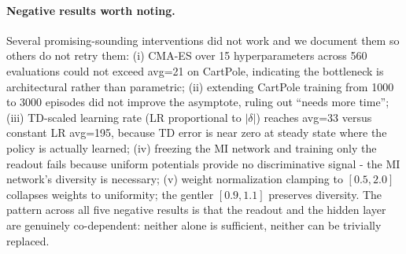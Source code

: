 \paragraph{Negative results worth noting.}
Several promising-sounding interventions did not work and we document them so others do not retry them: (i) CMA-ES over 15 hyperparameters across 560 evaluations could not exceed avg=21 on CartPole, indicating the bottleneck is architectural rather than parametric; (ii) extending CartPole training from 1000 to 3000 episodes did not improve the asymptote, ruling out ``needs more time''; (iii) TD-scaled learning rate (LR proportional to $|\delta|$) reaches avg=33 versus constant LR avg=195, because TD error is near zero at steady state where the policy is actually learned; (iv) freezing the MI network and training only the readout fails because uniform potentials provide no discriminative signal - the MI network's diversity is necessary; (v) weight normalization clamping to $[0.5, 2.0]$ collapses weights to uniformity; the gentler $[0.9, 1.1]$ preserves diversity. The pattern across all five negative results is that the readout and the hidden layer are genuinely co-dependent: neither alone is sufficient, neither can be trivially replaced.

